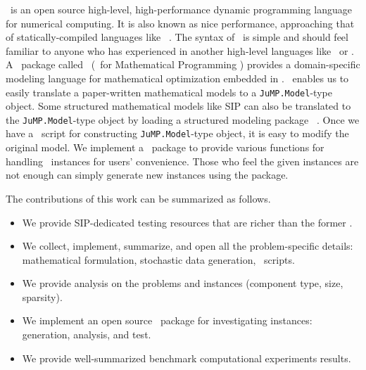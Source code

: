 \julia\ is an open source high-level, high-performance dynamic programming language for numerical computing. It is also known as nice performance, approaching that of statically-compiled languages like \clang\ \cite{journal:BEKS2017}. The syntax of \julia\ is simple and should feel familiar to anyone who has experienced in another high-level languages like \matlab\ or \python. A \julia\ package called \jump\ (\julia\ for Mathematical Programming \cite{web:JuMP}) provides a domain-specific modeling language for mathematical optimization embedded in \julia. \jump\ enables us to easily translate a paper-written mathematical models to a \texttt{JuMP.Model}-type object. Some structured mathematical models like SIP can also be translated to the \texttt{JuMP.Model}-type object by loading a structured modeling package \structjump\ \cite{web:StructJuMP}. Once we have a \julia\ script for constructing \texttt{JuMP.Model}-type object, it is easy to modify the original model. %
We implement a \julia\ package to provide various functions for handling \siplibtwo\ instances for users' convenience. Those who feel the given instances are not enough can simply generate new instances using the package.


The contributions of this work can be summarized as follows.
\begin{itemize}
	\item We provide SIP-dedicated testing resources that are richer than the former \siplib.
	\item We collect, implement, summarize, and open all the problem-specific details: mathematical formulation, stochastic data generation, \julia\ scripts.
	\item We provide analysis on the problems and instances (component type, size, sparsity).
	\item We implement an open source \julia\ package for investigating instances: generation, analysis, and test.
	\item We provide well-summarized benchmark computational experiments results.
\end{itemize}

